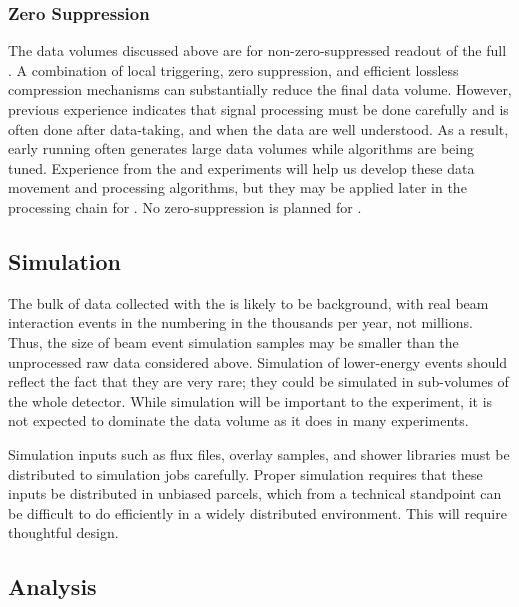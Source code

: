 \subsubsection{Zero Suppression}
\label{sec:exec-comp-cal-zs}

The data volumes discussed above are for non-zero-suppressed readout of the full . A combination of local triggering, zero suppression, and  efficient lossless compression mechanisms can substantially reduce the final data volume. However, previous experience  indicates that signal processing must be done carefully and %
is often done after data-taking, and when the data are well understood.  As a result, early running often generates large data volumes while algorithms are being tuned. 
Experience from  the  and  experiments will help us develop these data movement and processing algorithms, but they may be applied later in the processing chain for .  No zero-suppression is planned for .



\subsection{Simulation}
\label{sec:exec-comp-dt-sim}

The bulk of data collected with the  is likely to be background, with real beam interaction events in the  numbering in the thousands per year, not millions. Thus, the size of beam event simulation samples may be %
smaller than the unprocessed raw data considered above.  %
Simulation of lower-energy events should reflect the fact that they are very rare; they could be simulated in sub-volumes of the whole detector. 
While simulation will be important to the experiment, it is not expected to dominate the data volume as it does in many experiments.  

Simulation inputs such as flux files, overlay samples, and shower libraries %
must be distributed to simulation jobs carefully.   Proper simulation requires that these inputs be distributed in unbiased parcels, which from a technical standpoint can be difficult to do efficiently in a widely distributed environment. This will require thoughtful design. 

\subsection{Analysis}
\label{sec:exec-comp-anal}

